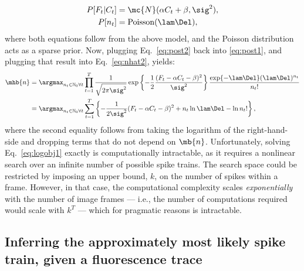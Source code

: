 \begin{subequations} \label{eq:post2}
\begin{align}
P[F_t | C_t] &= \mc{N}(\alpha C_t+\beta,\sig^2), \label{eq:lik2} \\
P[n_t] &= \text{Poisson}(\lam \Del), \label{eq:prior2} 
\end{align}
\end{subequations}
where both equations follow from the above model, and the Poisson distribution acts as a sparse prior.  Now, plugging Eq.~\eqref{eq:post2} back into \eqref{eq:post1}, and plugging that result into Eq.~\eqref{eq:nhat2}, yields:
\begin{subequations}  \label{eq:obj}
\begin{align}
\mhb{n} 	&= \anx \prod_{t=1}^T \frac{1}{\sqrt{2 \pi \sig^2}} \exp \left\{-\frac{1}{2}\frac{(F_t - \alpha C_t - \beta)^2}{\sig^2}\right\} \frac{\exp\{-\lam\Del\} (\lam\Del)^{n_t}}{n_t!}
\label{eq:obj1}\\ &= \anx  \sum_{t=1}^T \left\{ -\frac{1}{2 \sig^2}(F_t - \alpha C_t - \beta)^2  +  n_t \ln \lam \Del - \ln n_t! \right\}, \label{eq:logobj1}
\end{align} 
\end{subequations}
\noindent where the second equality follows from taking the logarithm of the right-hand-side and dropping terms that do not depend on $\mb{n}$.  Unfortunately, solving Eq.~\eqref{eq:logobj1} exactly is computationally intractable, as it requires a nonlinear search over an infinite number of  possible spike trains.  The search space could be restricted by imposing an upper bound, $k$, on the number of spikes within a frame.  However, in that case, the computational complexity scales \emph{exponentially} with the number of image frames --- i.e.,  the number of computations required would scale with $k^T$ --- which for pragmatic reasons is intractable.




\subsection{Inferring the approximately most likely spike train, given a fluorescence trace} \label{sec:inf}

